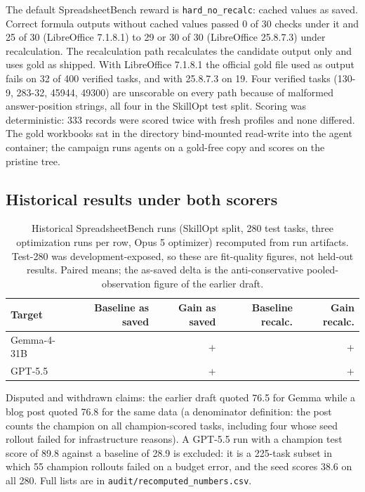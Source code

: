 The default SpreadsheetBench reward is \texttt{hard\_no\_recalc}: cached values as saved. Correct formula outputs without cached values passed 0 of 30 checks under it and 25 of 30 (LibreOffice 7.1.8.1) to 29 or 30 of 30 (LibreOffice 25.8.7.3) under recalculation. The recalculation path recalculates the candidate output only and uses gold as shipped. With LibreOffice 7.1.8.1 the official gold file used as output fails on 32 of 400 verified tasks, and with 25.8.7.3 on 19. Four verified tasks (130-9, 283-32, 45944, 49300) are unscorable on every path because of malformed answer-position strings, all four in the SkillOpt test split. Scoring was deterministic: 333 records were scored twice with fresh profiles and none differed. The gold workbooks sat in the directory bind-mounted read-write into the agent container; the campaign runs agents on a gold-free copy and scores on the pristine tree.

\subsection*{Historical results under both scorers}

\begin{table}[h]
\caption{Historical SpreadsheetBench runs (SkillOpt split, 280 test tasks, three optimization runs per row, Opus 5 optimizer) recomputed from run artifacts. Test-280 was development-exposed, so these are fit-quality figures, not held-out results. Paired means; the as-saved delta is the anti-conservative pooled-observation figure of the earlier draft.}
\label{tab:hist}
\centering\small
\begin{tabular}{@{}lrrrr@{}}
\toprule
Target & Baseline as saved & Gain as saved & Baseline recalc. & Gain recalc. \\
\midrule
Gemma-4-31B & \histGemmaBaseSaved{} & +\histGemmaDeltaSaved{} & \histGemmaBaseRecalc{} & +\histGemmaDeltaRecalc{} \\
GPT-5.5 & \histGptBaseSaved{} & +\histGptDeltaSaved{} & \histGptBaseRecalc{} & +\histGptDeltaRecalc{} \\
\bottomrule
\end{tabular}
\end{table}

Disputed and withdrawn claims: the earlier draft quoted 76.5 for Gemma while a blog post quoted 76.8 for the same data (a denominator definition: the post counts the champion on all champion-scored tasks, including four whose seed rollout failed for infrastructure reasons). A GPT-5.5 run with a champion test score of 89.8 against a baseline of 28.9 is excluded: it is a 225-task subset in which 55 champion rollouts failed on a budget error, and the seed scores 38.6 on all 280. Full lists are in \texttt{audit/recomputed\_numbers.csv}.


